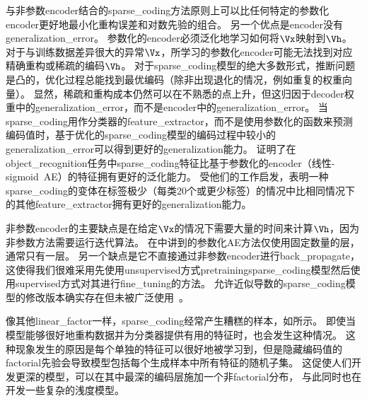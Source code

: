 与非参数\gls{encoder}结合的\gls{sparse_coding}方法原则上可以比任何特定的参数化\gls{encoder}更好地最小化重构误差和对数先验的组合。
另一个优点是\gls{encoder}没有\gls{generalization_error}。
参数化的\gls{encoder}必须泛化地学习如何将$\Vx$映射到$\Vh$。
对于与训练数据差异很大的异常$\Vx$，所学习的参数化\gls{encoder}可能无法找到对应精确重构或稀疏的编码$\Vh$。
对于\gls{sparse_coding}模型的绝大多数形式，推断问题是凸的，优化过程总能找到最优编码（除非出现退化的情况，例如重复的权重向量）。
显然，稀疏和重构成本仍然可以在不熟悉的点上升，但这归因于\gls{decoder}权重中的\gls{generalization_error}，而不是\gls{encoder}中的\gls{generalization_error}。
当\gls{sparse_coding}用作分类器的\gls{feature_extractor}，而不是使用参数化的函数来预测编码值时，基于优化的\gls{sparse_coding}模型的编码过程中较小的\gls{generalization_error}可以得到更好的\gls{generalization}能力。
\citet{Coates2011b}证明了在\gls{object_recognition}任务中\gls{sparse_coding}特征比基于参数化的\gls{encoder}（线性-\gls{sigmoid}~\gls{AE}）的特征拥有更好的泛化能力。
受他们的工作启发，\citet{Goodfeli-et-al-TPAMI-Deep-PrePrint-2013-small}表明一种\gls{sparse_coding}的变体在标签极少（每类20个或更少标签）的情况中比相同情况下的其他\gls{feature_extractor}拥有更好的\gls{generalization}能力。



非参数\gls{encoder}的主要缺点是在给定$\Vx$的情况下需要大量的时间来计算$\Vh$，因为非参数方法需要运行迭代算法。
在中讲到的参数化\gls{AE}方法仅使用固定数量的层，通常只有一层。
另一个缺点是它不直接通过非参数\gls{encoder}进行\gls{back_propagate}，这使得我们很难采用先使用\gls{unsupervised}方式\gls{pretraining}\gls{sparse_coding}模型然后使用\gls{supervised}方式对其进行\gls{fine_tuning}的方法。
允许近似导数的\gls{sparse_coding}模型的修改版本确实存在但未被广泛使用~\citep{Bradley+Bagnell-2009-small}。

像其他\gls{linear_factor}一样，\gls{sparse_coding}经常产生糟糕的样本，如所示。
即使当模型能够很好地重构数据并为分类器提供有用的特征时，也会发生这种情况。
这种现象发生的原因是每个单独的特征可以很好地被学习到，但是隐藏编码值的\gls{factorial}先验会导致模型包括每个生成样本中所有特征的随机子集。
这促使人们开发更深的模型，可以在其中最深的编码层施加一个非\gls{factorial}分布， 与此同时也在开发一些复杂的浅度模型。

